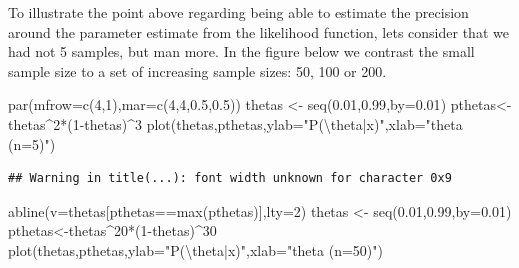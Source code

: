 \documentclass[
]{book}
\newenvironment{Shaded}{\begin{snugshade}}{\end{snugshade}}
\newcommand{\AttributeTok}[1]{\textcolor[rgb]{0.77,0.63,0.00}{#1}}
\newcommand{\DecValTok}[1]{\textcolor[rgb]{0.00,0.00,0.81}{#1}}
\newcommand{\FloatTok}[1]{\textcolor[rgb]{0.00,0.00,0.81}{#1}}
\newcommand{\FunctionTok}[1]{\textcolor[rgb]{0.00,0.00,0.00}{#1}}
\newcommand{\NormalTok}[1]{#1}
\newcommand{\OtherTok}[1]{\textcolor[rgb]{0.56,0.35,0.01}{#1}}
\newcommand{\SpecialCharTok}[1]{\textcolor[rgb]{0.00,0.00,0.00}{#1}}
\newcommand{\StringTok}[1]{\textcolor[rgb]{0.31,0.60,0.02}{#1}}
\begin{document}
To illustrate the point above regarding being able to estimate the precision around the parameter estimate from the likelihood function, lets consider that we had not 5 samples, but man more. In the figure below we contrast the small sample size to a set of increasing sample sizes: 50, 100 or 200.

\begin{Shaded}
\begin{Highlighting}[]
\FunctionTok{par}\NormalTok{(}\AttributeTok{mfrow=}\FunctionTok{c}\NormalTok{(}\DecValTok{4}\NormalTok{,}\DecValTok{1}\NormalTok{),}\AttributeTok{mar=}\FunctionTok{c}\NormalTok{(}\DecValTok{4}\NormalTok{,}\DecValTok{4}\NormalTok{,}\FloatTok{0.5}\NormalTok{,}\FloatTok{0.5}\NormalTok{))}
\NormalTok{thetas }\OtherTok{\textless{}{-}} \FunctionTok{seq}\NormalTok{(}\FloatTok{0.01}\NormalTok{,}\FloatTok{0.99}\NormalTok{,}\AttributeTok{by=}\FloatTok{0.01}\NormalTok{)}
\NormalTok{pthetas}\OtherTok{\textless{}{-}}\NormalTok{thetas}\SpecialCharTok{\^{}}\DecValTok{2}\SpecialCharTok{*}\NormalTok{(}\DecValTok{1}\SpecialCharTok{{-}}\NormalTok{thetas)}\SpecialCharTok{\^{}}\DecValTok{3}
\FunctionTok{plot}\NormalTok{(thetas,pthetas,}\AttributeTok{ylab=}\StringTok{"P(}\SpecialCharTok{\textbackslash{}t}\StringTok{heta|x)"}\NormalTok{,}\AttributeTok{xlab=}\StringTok{"theta (n=5)"}\NormalTok{)}
\end{Highlighting}
\end{Shaded}

\begin{verbatim}
## Warning in title(...): font width unknown for character 0x9
\end{verbatim}

\begin{Shaded}
\begin{Highlighting}[]
\FunctionTok{abline}\NormalTok{(}\AttributeTok{v=}\NormalTok{thetas[pthetas}\SpecialCharTok{==}\FunctionTok{max}\NormalTok{(pthetas)],}\AttributeTok{lty=}\DecValTok{2}\NormalTok{)}
\NormalTok{thetas }\OtherTok{\textless{}{-}} \FunctionTok{seq}\NormalTok{(}\FloatTok{0.01}\NormalTok{,}\FloatTok{0.99}\NormalTok{,}\AttributeTok{by=}\FloatTok{0.01}\NormalTok{)}
\NormalTok{pthetas}\OtherTok{\textless{}{-}}\NormalTok{thetas}\SpecialCharTok{\^{}}\DecValTok{20}\SpecialCharTok{*}\NormalTok{(}\DecValTok{1}\SpecialCharTok{{-}}\NormalTok{thetas)}\SpecialCharTok{\^{}}\DecValTok{30}
\FunctionTok{plot}\NormalTok{(thetas,pthetas,}\AttributeTok{ylab=}\StringTok{"P(}\SpecialCharTok{\textbackslash{}t}\StringTok{heta|x)"}\NormalTok{,}\AttributeTok{xlab=}\StringTok{"theta  (n=50)"}\NormalTok{)}
\end{Highlighting}
\end{Shaded}
\end{document}
